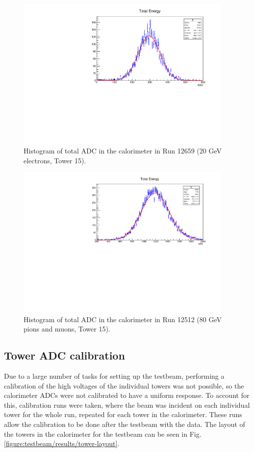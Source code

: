 \begin{figure}[p]
	\centering
	\includegraphics[width=0.95\textwidth]{../Pictures/IDEA/totalEnergyBoth.pdf}
	\caption{Histogram of total \acrshort{ADC} in the calorimeter in Run 12659 (20 GeV electrons, Tower 15).}
	\label{figure:testbeam/results/total-adc-20}
\end{figure}

\begin{figure}[p]
	\centering
	\includegraphics[width=0.95\textwidth]{../Pictures/IDEA/totalEnergy80GeV.pdf}
	\caption{Histogram of total \acrshort{ADC} in the calorimeter in Run 12512 (80 GeV pions and muons, Tower 15).}
	\label{figure:testbeam/results/total-adc-80}
\end{figure}

\subsection{Tower ADC calibration}
\label{section:tower-calibration}
Due to a large number of tasks for setting up the testbeam, performing a calibration of the high voltages of the individual towers was not possible, so the calorimeter \acrshort{ADC}s were not calibrated to have a uniform response. To account for this, calibration runs were taken, where the beam was incident on each individual tower for the whole run, repeated for each tower in the calorimeter. These runs allow the calibration to be done after the testbeam with the data. The layout of the towers in the calorimeter for the testbeam can be seen in Fig. \ref{figure:testbeam/results/tower-layout}.

